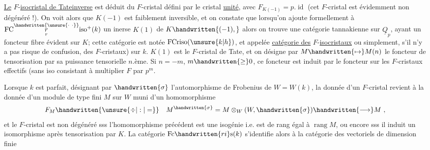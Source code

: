 \uline{Le} $F$-\uline{isocristal de Tate\inserted{\handwritten{\ }}inverse} est déduit du $F$\handwritten{\unsure{(}}-cristal défini par le cristal \uline{unité}, avec $F_{K(-1)}=p.\operatorname{id}$ (cet $F$-cristal est évidemment non dégénéré !). On voit alors que $K(-1)$ est faiblement inversible, et on constate que lorsqu'on ajoute formellement à $\mathrm{FC}\overset{\handwritten{\unsure{\cdot\ \cdot}}}{\underset{r}{r}}\mathrm{iso}^{+}(k)$  un inerse $K(1)$ de $K\handwritten{(-1),}$ alors on trouve une catégorie tannakienne sur $\underline{Q}_p$, ayant un foncteur fibre évident sur $K$; cette catégorie est notée $\operatorname{FCriso}(\unsure{k|h})$, et appelée \uline{catégorie des} $F$-\uline{isocristaux} \handwritten{(}ou simplement, s'il n'y  a pas risque de confusion, des $F$-cristaux) sur $k$. $K(1)$ est le $F$\handwritten{(}-cristal de Tate, et on désigne par $M\handwritten{\mapsto}M(n)$ le foncteur de tensorisation par sa puissance tensorielle $n$.ème. Si $n=-m$, $m\handwritten{\geq}0$, ce foncteur est induit par le foncteur sur les $F$-cristaux effectifs (sans iso\unsure{)} consistant à multiplier $F$ par $p^m$.

 Lorsque $k$ est parfait, désignant par $\handwritten{\sigma}$ l'automorphisme de Frobenius de $W=W(k)$, la donnée d'un $F$-cristal revient à la donnée d'un module de type fini $M$ sur $W$ muni d'un homomorphisme
\[
F_M\handwritten{\unsure{\div|:|=}}\quad M^{\handwritten{\sigma}}=M\otimes_W(W,\handwritten{\sigma})\handwritten{\longrightarrow}M\ ,
\]
et le $F$\handwritten{(}-cristal est non dégénéré sss l'homomorphisme précédent est une isogénie i.e. est de rang égal à $\operatorname{rang}M$, ou encore sss il induit un isomorphisme après tensorisation par $K$. La catégorie  $\mathrm{Fc}\handwritten{ri}\mathrm{s}(k)$ s'identifie alors à la catégorie des vectoriels de dimension finie
